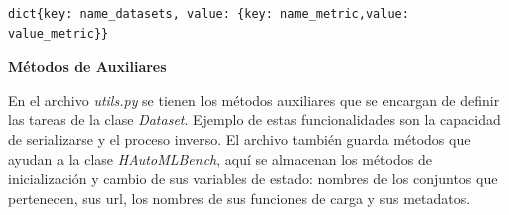 \begin{lstlisting}[caption= Estructura del archivo que almacena los resultados experimentales, label= code:archive-result]
dict{key: name_datasets, value: {key: name_metric,value: value_metric}}
\end{lstlisting}
\begin{flushleft} 
    {\large {\textbf{Métodos de Auxiliares}}}\label{method:methods}
\end{flushleft}
En el archivo \textit{utils.py} se tienen los métodos auxiliares que se encargan de definir las tareas de la clase \textit{Dataset}. Ejemplo de estas funcionalidades 
son la capacidad de serializarse y el proceso inverso. El archivo también guarda métodos que ayudan a la clase \textit{HAutoMLBench}, aquí se almacenan los métodos de 
inicialización y cambio de sus variables de estado: nombres de los conjuntos que pertenecen, sus url, los nombres de sus funciones de carga y sus metadatos.   





